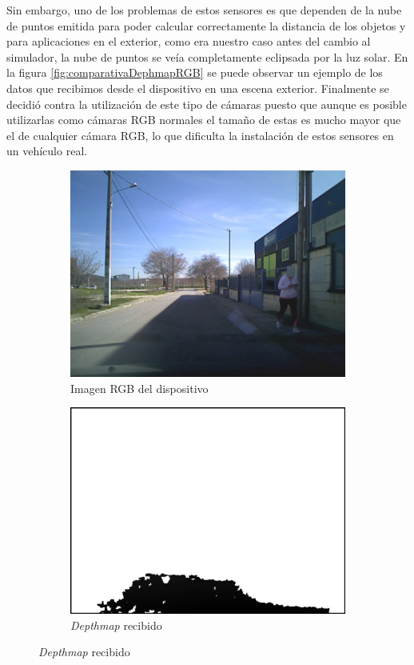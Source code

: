 Sin embargo, uno de los problemas de estos sensores es que dependen de la nube de puntos emitida para poder calcular correctamente la distancia de los objetos y para aplicaciones en el exterior, como era nuestro caso antes del cambio al simulador, la nube de puntos se veía completamente eclipsada por la luz solar. 
En la figura \ref{fig:comparativaDephmapRGB} se puede observar un ejemplo de los datos que recibimos desde el dispositivo en una escena exterior.
Finalmente se decidió contra la utilización de este tipo de cámaras puesto que aunque es posible utilizarlas como cámaras RGB normales el tamaño de estas es mucho mayor que el de cualquier cámara RGB, lo que dificulta la instalación de estos sensores en un vehículo real.

\begin{figure}[h!]
    \begin{subfigure}[c]{.5\textwidth}
      \centering
      \includegraphics[width=.8\linewidth]{img/comparativaDephRGB/rgb.png}
      \caption{Imagen RGB del dispositivo}
      \label{fig:sfig1}
    \end{subfigure}%
    \begin{subfigure}[c]{.5\textwidth}
      \centering
      \includegraphics[width=.8\linewidth]{img/comparativaDephRGB/depth.png}
      \caption{\textit{Depthmap} recibido}
      \label{fig:sfig2}
    \end{subfigure}
    

\end{figure}
